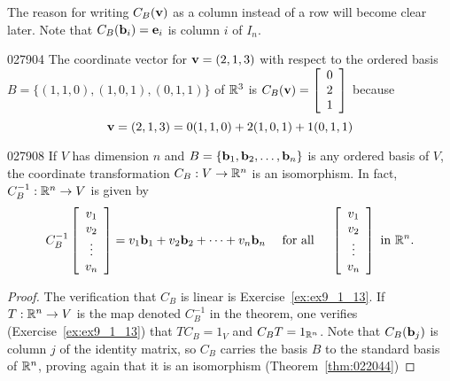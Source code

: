 \noindent The reason for writing $C_{B}(\textbf{v})$ as a column instead of a row will become clear later. Note that $C_{B}(\textbf{b}_{i}) = \textbf{e}_{i}$ is column $i$ of $I_{n}$.

\begin{example}{}{027904}
The coordinate vector for $\textbf{v} = (2, 1, 3)$ with respect to the ordered basis $B = \{(1, 1, 0), (1, 0, 1), (0, 1, 1)\}$ of $\mathbb{R}^3$ is $C_B(\textbf{v}) = \left[ \begin{array}{c} 0 \\ 2 \\ 1 \end{array} \right]$ because
\begin{equation*}
  \textbf{v} = (2, 1, 3) = 0(1, 1, 0) + 2(1, 0, 1) + 1(0, 1, 1)
\end{equation*}
\end{example}

\begin{theorem}{}{027908}
If $V$ has dimension $n$ and $B = \{\textbf{b}_{1}, \textbf{b}_{2}, \dots, \textbf{b}_{n}\}$ is any ordered basis of $V$, the coordinate transformation $C_{B} : V \to \mathbb{R}^n$ is an isomorphism. In fact, $C_B^{-1} : \mathbb{R}^n \to V$ is given by
\begin{equation*}
C_B^{-1} \left[ \begin{array}{c} v_1 \\ v_2 \\ \vdots \\ v_n \end{array} \right] = v_1\textbf{b}_1 + v_2\textbf{b}_2 + \cdots + v_n\textbf{b}_n \quad \mbox{ for all } \quad \left[ \begin{array}{c} v_1 \\ v_2 \\ \vdots \\ v_n \end{array} \right] \mbox{ in } \mathbb{R}^n.
\end{equation*}
\end{theorem}

\begin{proof}
The verification that $C_{B}$ is linear is Exercise~\ref{ex:ex9_1_13}. If $T : \mathbb{R}^n \to V$ is the map denoted $C_B^{-1}$ in the theorem, one verifies (Exercise~\ref{ex:ex9_1_13}) that $TC_{B} = 1_{V}$ and $C_BT = 1_{\mathbb{R}^n}$. Note that $C_{B}(\textbf{b}_{j})$ is column $j$ of the identity matrix, so $C_{B}$ carries the basis $B$ to the standard basis of $\mathbb{R}^n$, proving again that it is an isomorphism (Theorem~\ref{thm:022044})
\end{proof}

